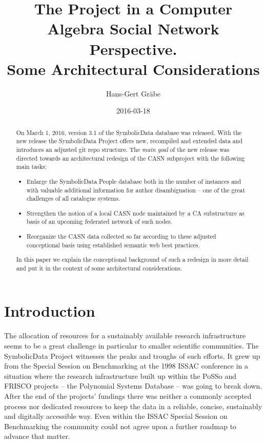\documentclass{llncs}
\title{The {\SD} Project in a Computer Algebra Social Network Perspective.\\
  Some Architectural Considerations}
\author{Hans-Gert Gr\"abe}
\institute{Leipzig University, Leipzig, Germany\\
\email{graebe@informatik.uni-leipzig.de}}
\date{2016-03-18}
\newcommand{\SD}{{\sc Symbo\-lic\-Data}}
\begin{document}
\maketitle

\begin{abstract}  
  On March 1, 2016, version 3.1 of the {\SD} data\-base was released. With the
  new release the {\SD} Project offers new, recompiled and extended data and
  introduces an adjusted git repo structure. The \emph{main goal} of the new
  release was directed towards an architectural redesign of the CASN
  subproject with the following main tasks:
\begin{itemize}
\item Enlarge the {\SD} People database both in the number of instances and
  with valuable additional information for author disambiguation -- one of the
  great challenges of all catalogue systems.
\item Strengthen the notion of a local CASN node maintained by a CA
  substructure as basis of an upcoming federated network of such nodes.
\item Reorganize the CASN data collected so far according to these adjusted
  conceptional basis using established semantic web best practices.
\end{itemize}
In this paper we explain the conceptional background of such a redesign in
more detail and put it in the context of some architectural considerations. 
\end{abstract}

\section{Introduction}
The allocation of resources for a sustainably available research
infrastructure seems to be a great challenge in particular to smaller
scientific communities. The {\SD} Project witnesses the peaks and troughs of
such efforts. It grew up from the Special Session on Benchmarking at the 1998
ISSAC conference in a situation where the research infrastructure built up
within the PoSSo \cite{PoSSo} and FRISCO \cite{FRISCO} projects -- the
Polynomial Systems Database -- was going to break down. After the end of the
projects' fundings there was neither a commonly accepted process nor dedicated
resources to keep the data in a reliable, concise, sustainably and digitally
accessible way. Even within the ISSAC Special Session on Benchmarking the
community could not agree upon a further roadmap to advance that matter.
\end{document}
